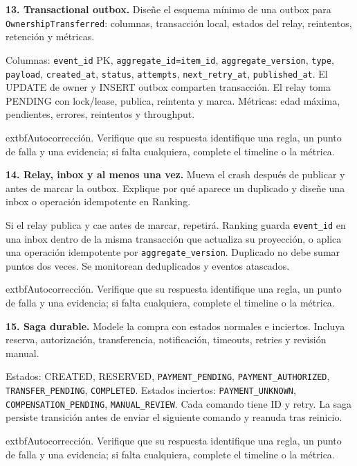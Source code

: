 \documentclass[variant=guiaresuelta,cover=institutional,mode=screen]{ua-engineering-v6-article}
\begin{document}
\begin{uaexercise}
\textbf{13. Transactional outbox.} Diseñe el esquema mínimo de una outbox para \texttt{OwnershipTransferred}: columnas, transacción local, estados del relay, reintentos, retención y métricas.
\end{uaexercise}
\begin{uaanswer}
Columnas: \texttt{event\_id} PK, \texttt{aggregate\_id=item\_id}, \texttt{aggregate\_version}, \texttt{type}, \texttt{payload}, \texttt{created\_at}, \texttt{status}, \texttt{attempts}, \texttt{next\_retry\_at}, \texttt{published\_at}. El UPDATE de owner y INSERT outbox comparten transacción. El relay toma PENDING con lock/lease, publica, reintenta y marca. Métricas: edad máxima, pendientes, errores, reintentos y throughput.
\par\smallskip	extbf{Autocorrección.} Verifique que su respuesta identifique una regla, un punto de falla y una evidencia; si falta cualquiera, complete el timeline o la métrica.
\end{uaanswer}
\begin{uaexercise}
\textbf{14. Relay, inbox y al menos una vez.} Mueva el crash después de publicar y antes de marcar la outbox. Explique por qué aparece un duplicado y diseñe una inbox o operación idempotente en Ranking.
\end{uaexercise}
\begin{uaanswer}
Si el relay publica y cae antes de marcar, repetirá. Ranking guarda \texttt{event\_id} en una inbox dentro de la misma transacción que actualiza su proyección, o aplica una operación idempotente por \texttt{aggregate\_version}. Duplicado no debe sumar puntos dos veces. Se monitorean deduplicados y eventos atascados.
\par\smallskip	extbf{Autocorrección.} Verifique que su respuesta identifique una regla, un punto de falla y una evidencia; si falta cualquiera, complete el timeline o la métrica.
\end{uaanswer}
\begin{uaexercise}
\textbf{15. Saga durable.} Modele la compra con estados normales e inciertos. Incluya reserva, autorización, transferencia, notificación, timeouts, retries y revisión manual.
\end{uaexercise}
\begin{uaanswer}
Estados: CREATED, RESERVED, \texttt{PAYMENT\_PENDING}, \texttt{PAYMENT\_AUTHORIZED}, \texttt{TRANSFER\_PENDING}, \texttt{COMPLETED}. Estados inciertos: \texttt{PAYMENT\_UNKNOWN}, \texttt{COMPENSATION\_PENDING}, \texttt{MANUAL\_REVIEW}. Cada comando tiene ID y retry. La saga persiste transición antes de enviar el siguiente comando y reanuda tras reinicio.
\par\smallskip	extbf{Autocorrección.} Verifique que su respuesta identifique una regla, un punto de falla y una evidencia; si falta cualquiera, complete el timeline o la métrica.
\end{uaanswer}
\end{document}
